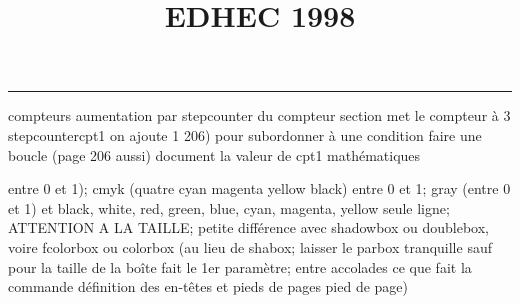 \documentclass[11pt]{article}%
\title{\bf \vspace{-2cm} EDHEC 1998} %
\author{} %
\date{} %
\renewcommand{\headrulewidth}{0pt}%
\renewcommand{\footrulewidth}{0.4pt}%
\begin{document}
\maketitle %
\vspace{-1.4cm}\hrule %
\thispagestyle{fancy}

\vspace*{.2cm}



compteurs%
aumentation par stepcounter du compteur section%
met le compteur à 3%
stepcounter{cpt1} on ajoute 1%
206) pour subordonner à une condition %
faire une boucle (page 206 aussi) %
document la valeur de cpt1 
mathématiques\newcommand{\ch}{\operatorname{ch}} 
\newcommand{\sh}{\operatorname{sh}}
\renewcommand{\tanh}{\operatorname{th}}
\renewcommand{\sinh}{\operatorname{sh}}
\renewcommand{\cosh}{\operatorname{ch}}
\newcommand{\argsh}{\operatorname{argsh}}
\newcommand{\argch}{\operatorname{argch}}
\newcommand{\argth}{\operatorname{argth}}
\newcommand{\ker}{\operatorname{Ker}}
\renewcommand{\im}{\operatorname{Im}}
\newcommand{\rg}{\operatorname{rg}}
\newcommand{\Id}{\operatorname{Id}}
\newcommand{\id}{\operatorname{id}}
\renewcommand{\leq}{\leq}
\renewcommand{\geq}{\geq }

entre 0 et 1); cmyk (quatre cyan magenta yellow black) entre 0 et 1;
gray (entre 0 et 1) et black, white, red, green, blue, cyan, magenta,
yellow%
seule ligne; ATTENTION A LA TAILLE; petite différence avec shadowbox ou
doublebox, voire fcolorbox ou colorbox (au lieu de shabox; laisser le
parbox tranquille sauf pour la taille de la boîte
\newcommand{\Tbox}[1]{\begin{center} \shabox{\parbox{0.6
\linewidth}{#1}} \end{center}} %
fait le 1er paramètre; entre accolades ce que fait la commande
définition des en-têtes et pieds de pages\pagestyle{fancy}
\chead{}
\rfoot[ \ \thepage]{\thepage}
\cfoot{}
\lfoot{}
\thispagestyle{fancy} %
pied de page)\renewcommand{\footrulewidth}{0.4pt}
\renewcommand{\headrulewidth}{0.4pt}
\end{document}
